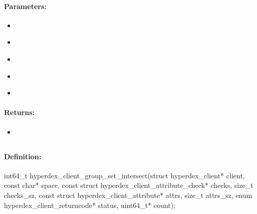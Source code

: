 \paragraph{Parameters:}
\begin{itemize}[noitemsep]
\item {}\\

\item {}\\

\item {}\\

\item {}\\

\item {}\\

\end{itemize}

\paragraph{Returns:}
\begin{itemize}[noitemsep]
\item {}\\

\end{itemize}

\pagebreak
\subsection{}
\label{api:c:group_set_intersect}


\paragraph{Definition:}
\begin{ccode}
int64_t hyperdex_client_group_set_intersect(struct hyperdex_client* client,
        const char* space,
        const struct hyperdex_client_attribute_check* checks, size_t checks_sz,
        const struct hyperdex_client_attribute* attrs, size_t attrs_sz,
        enum hyperdex_client_returncode* status,
        uint64_t* count);
\end{ccode}

